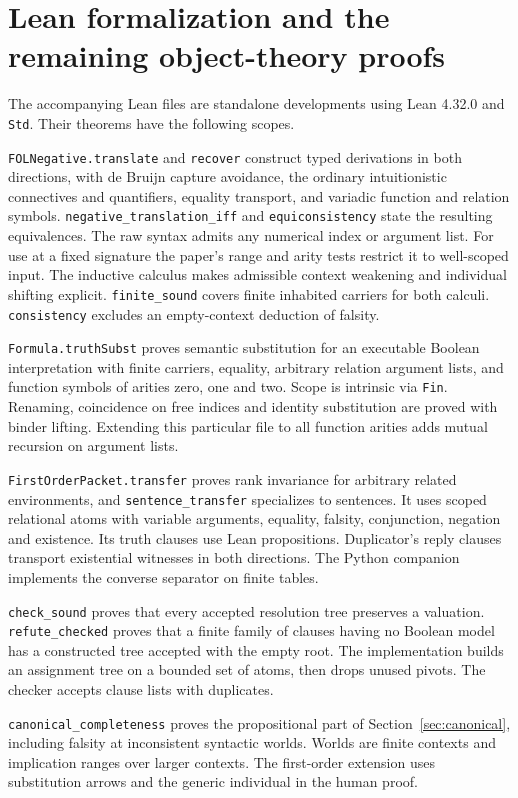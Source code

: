 \section{Lean formalization and the remaining object-theory proofs}\label{sec:lean}
The accompanying Lean files are standalone developments using Lean 4.32.0 and \texttt{Std}. Their theorems have the following scopes.
\begin{description}[style=nextline,leftmargin=1.25em]
\item[\texttt{NegativeTranslation.lean}]
\texttt{FOLNegative.translate} and \texttt{recover} construct typed derivations in both directions, with de Bruijn capture avoidance, the ordinary intuitionistic connectives and quantifiers, equality transport, and variadic function and relation symbols. \texttt{negative\_translation\_iff} and \texttt{equiconsistency} state the resulting equivalences. The raw syntax admits any numerical index or argument list. For use at a fixed signature the paper's range and arity tests restrict it to well-scoped input. The inductive calculus makes admissible context weakening and individual shifting explicit. \texttt{finite\_sound} covers finite inhabited carriers for both calculi. \texttt{consistency} excludes an empty-context deduction of falsity.
\item[\texttt{Substitution.lean}]
\texttt{Formula.truthSubst} proves semantic substitution for an executable Boolean interpretation with finite carriers, equality, arbitrary relation argument lists, and function symbols of arities zero, one and two. Scope is intrinsic via \texttt{Fin}. Renaming, coincidence on free indices and identity substitution are proved with binder lifting. Extending this particular file to all function arities adds mutual recursion on argument lists.
\item[\texttt{BackAndForth.lean}]
\texttt{FirstOrderPacket.transfer} proves rank invariance for arbitrary related environments, and \texttt{sentence\_transfer} specializes to sentences. It uses scoped relational atoms with variable arguments, equality, falsity, conjunction, negation and existence. Its truth clauses use Lean propositions. Duplicator's reply clauses transport existential witnesses in both directions. The Python companion implements the converse separator on finite tables.
\item[\texttt{GroundResolution.lean}]
\texttt{check\_sound} proves that every accepted resolution tree preserves a valuation. \texttt{refute\_checked} proves that a finite family of clauses having no Boolean model has a constructed tree accepted with the empty root. The implementation builds an assignment tree on a bounded set of atoms, then drops unused pivots. The checker accepts clause lists with duplicates.
\item[\texttt{CanonicalForcing.lean}]
\texttt{canonical\_completeness} proves the propositional part of Section~\ref{sec:canonical}, including falsity at inconsistent syntactic worlds. Worlds are finite contexts and implication ranges over larger contexts. The first-order extension uses substitution arrows and the generic individual in the human proof.
\end{description}
